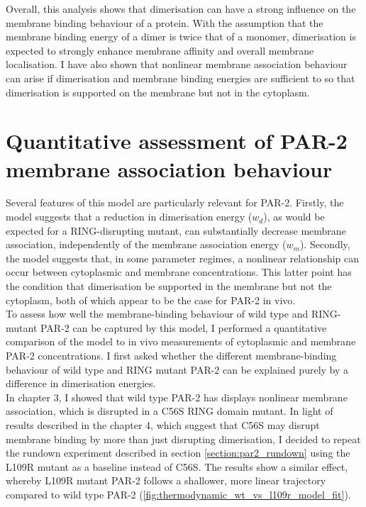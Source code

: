 \documentclass[12pt]{"report"}
\begin{document}
Overall, this analysis shows that dimerisation can have a strong influence on the membrane binding behaviour of a protein. With the assumption that the membrane binding energy of a dimer is twice that of a monomer, dimerisation is expected to strongly enhance membrane affinity and overall membrane localisation. I have also shown that nonlinear membrane association behaviour can arise if dimerisation and membrane binding energies are sufficient to so that dimerisation is supported on the membrane but not in the cytoplasm.\\

\clearpage
\section{Quantitative assessment of PAR-2 membrane association behaviour}

Several features of this model are particularly relevant for PAR-2. Firstly, the model suggests that a reduction in dimerisation energy ($w_d$), as would be expected for a RING-disrupting mutant, can substantially decrease membrane association, independently of the membrane association energy ($w_m$). Secondly, the model suggests that, in some parameter regimes, a nonlinear relationship can occur between cytoplasmic and membrane concentrations. This latter point has the condition that dimerisation be supported in the membrane but not the cytoplasm, both of which appear to be the case for PAR-2 in vivo.\\

To assess how well the membrane-binding behaviour of wild type and RING-mutant PAR-2 can be captured by this model, I performed a quantitative comparison of the model to in vivo measurements of cytoplasmic and membrane PAR-2 concentrations. I first asked whether the different membrane-binding behaviour of wild type and RING mutant PAR-2 can be explained purely by a difference in dimerisation energies. \\

In chapter 3, I showed that wild type PAR-2 has displays nonlinear membrane association, which is disrupted in a C56S RING domain mutant. In light of results described in the chapter 4, which suggest that C56S may disrupt membrane binding by more than just disrupting dimerisation, I decided to repeat the rundown experiment described in section \ref{section:par2_rundown} using the L109R mutant as a baseline instead of C56S. The results show a similar effect, whereby L109R mutant PAR-2 follows a shallower, more linear trajectory compared to wild type PAR-2 (\cref{fig:thermodynamic_wt_vs_l109r_model_fit}).\\
\end{document}
